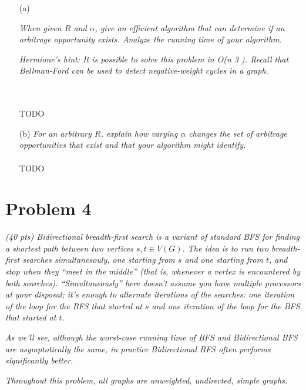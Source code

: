 \documentclass[12pt]{article} \setlength{\oddsidemargin}{0in}
\begin{document}
\begin{enumerate}
\item[(a)]{\textit{When given $R$ and $\alpha$, give an efficient algorithm that can determine if an arbitrage opportunity exists. Analyze the running time of your algorithm.}

    \textit{Hermione’s hint: It is possible to solve this problem in O(n 3 ). Recall that Bellman-Ford can be used to detect negative-weight cycles in a graph.}
  }
  \\\\
  TODO
  \\
\item[(b)]{\textit{For an arbitrary $R$, explain how varying $\alpha$ changes the set of arbitrage opportunities that exist and that your algorithm might identify.}}
  \\\\
  TODO

\end{enumerate}

\newpage
\section*{Problem 4}

\textit{(40 pts) Bidirectional breadth-first search is a variant of standard BFS for finding a
shortest path between two vertices $s, t \in V(G)$. The idea is to run two breadth-first
searches simultanesouly, one starting from $s$ and one starting from $t$, and stop when
they “meet in the middle” (that is, whenever a vertex is encountered by both searches).
``Simultaneously'' here doesn’t assume you have multiple processors at your disposal;
it’s enough to alternate iterations of the searches: one iteration of the loop for the BFS
that started at $s$ and one iteration of the loop for the BFS that started at $t$.}

\textit{As we’ll see, although the worst-case running time of BFS and Bidirectional BFS are
asymptotically the same, in practice Bidirectional BFS often performs significantly
better.}

\textit{Throughout this problem, all graphs are unweighted, undirected, simple graphs.}
\\\\
\end{document}

